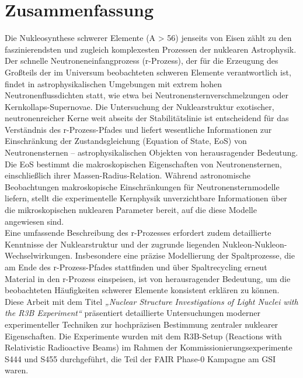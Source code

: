 \thispagestyle{empty}
\section*{Zusammenfassung}

Die Nukleosynthese schwerer Elemente (A > 56) jenseits von Eisen zählt zu den faszinierendsten und zugleich komplexesten Prozessen der nuklearen Astrophysik. Der schnelle Neutroneneinfangprozess (r-Prozess), der für die Erzeugung des Großteils der im Universum beobachteten schweren Elemente verantwortlich ist, findet in astrophysikalischen Umgebungen mit extrem hohen Neutronenflussdichten statt, wie etwa bei Neutronensternverschmelzungen oder Kernkollaps-Supernovae. Die Untersuchung der Nuklearstruktur exotischer, neutronenreicher Kerne weit abseits der Stabilitätslinie ist entscheidend für das Verständnis des r-Prozess-Pfades und liefert wesentliche Informationen zur Einschränkung der Zustandsgleichung (Equation of State, EoS) von Neutronensternen – astrophysikalischen Objekten von herausragender Bedeutung. Die EoS bestimmt die makroskopischen Eigenschaften von Neutronensternen, einschließlich ihrer Massen-Radius-Relation. Während astronomische Beobachtungen makroskopische Einschränkungen für Neutronensternmodelle liefern, stellt die experimentelle Kernphysik unverzichtbare Informationen über die mikroskopischen nuklearen Parameter bereit, auf die diese Modelle angewiesen sind.\\
Eine umfassende Beschreibung des r-Prozesses erfordert zudem detaillierte Kenntnisse der Nuklearstruktur und der zugrunde liegenden Nukleon-Nukleon-Wechselwirkungen. Insbesondere eine präzise Modellierung der Spaltprozesse, die am Ende des r-Prozess-Pfades stattfinden und über Spaltrecycling erneut Material in den r-Prozess einspeisen, ist von herausragender Bedeutung, um die beobachteten Häufigkeiten schwerer Elemente konsistent erklären zu können.\\
Diese Arbeit mit dem Titel \textit{„Nuclear Structure Investigations of Light Nuclei with the R3B Experiment“} präsentiert detaillierte Untersuchungen moderner experimenteller Techniken zur hochpräzisen Bestimmung zentraler nuklearer Eigenschaften. Die Experimente wurden mit dem R3B-Setup (Reactions with Relativistic Radioactive Beams) im Rahmen der Kommissionierungsexperimente S444 und S455 durchgeführt, die Teil der FAIR Phase-0 Kampagne am GSI waren.\\
